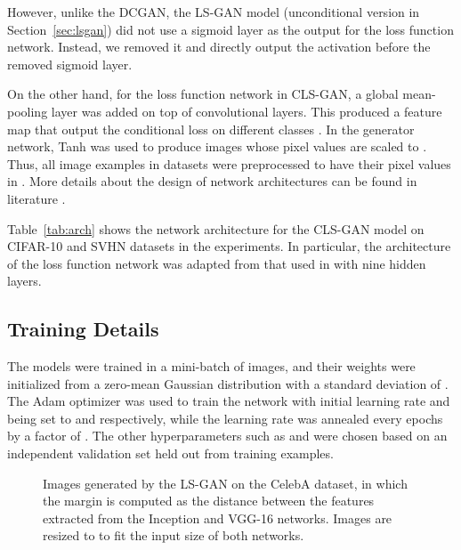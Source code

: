 \documentclass[11pt,fullpage, letterpaper,twoside]{article}
\newcommand{\1}[1]{\mathds{1}_{\left[#1\right]}}
\begin{document}
However, unlike the DCGAN, the LS-GAN model (unconditional version in Section~\ref{sec:lsgan}) did not use a sigmoid layer as the output for the loss function network.  Instead, we removed it and directly output the activation before the removed sigmoid layer.




On the other hand, for the loss function network in CLS-GAN, a global mean-pooling layer was added on top of convolutional layers.  This produced a  feature map that output the conditional loss  on different classes .
In the generator network, Tanh was used to produce images whose pixel values are scaled to . Thus, all image examples in datasets were preprocessed to have their pixel values in .
More details about the design of network architectures can be found in literature \cite{radford2015unsupervised}.

Table~\ref{tab:arch} shows the network architecture for the CLS-GAN model on CIFAR-10 and SVHN datasets in the experiments.  In particular, the architecture of the loss function network was adapted from that used in \cite{springenberg2015unsupervised} with nine hidden layers.




\subsection{Training Details}
The models were trained in a mini-batch of  images, and their weights were initialized from a zero-mean Gaussian distribution with a standard deviation of . The Adam optimizer \cite{kingma2014adam} was used to train the network with initial learning rate and  being set to  and  respectively, while the learning rate was annealed every  epochs by a factor of . The other hyperparameters such as  and  were chosen based on an independent validation set held out from training examples.


\begin{figure}[t]
\centering
{}
\caption{Images generated by the LS-GAN on the CelebA dataset, in which the margin is computed as the distance between the features extracted from the Inception and VGG-16 networks. Images are resized to  to fit the input size of both networks.}\label{fig:inception_vgg}
\end{figure}
\end{document}
